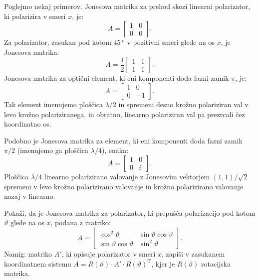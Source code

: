 Poglejmo nekaj primerov. Jonesova matrika za prehod skozi linearni polarizator, ki
polarizira v smeri $x$, je:
\begin{equation}
A=\left[\begin{array}{cc}
1 & 0\\
0 & 0
\end{array}\right]\!\!.
\end{equation}
Za polarizator, zasukan pod kotom $45~\si{\degree}$ v pozitivni 
smeri glede na os $x$, je Jonesova matrika:
\begin{equation}
A=\frac{1}{2}\left[\begin{array}{cc}
1 & 1\\
1 & 1
\end{array}\right]\!\!.
\end{equation}
Jonesova matrika za optični element, ki eni komponenti doda fazni zamik $\pi$, je:
\begin{equation}
A=\left[\begin{array}{cc}
1 & 0\\
0 & -1
\end{array}\right]\!\!.
\end{equation}
Tak element imenujemo ploščica $\lambda/2$ in 
spremeni desno krožno polariziran val v levo krožno
polariziranega, in obratno, linearno polariziran val pa prezrcali čez koordinatno os. 

Podobno je Jonesova matrika za element, ki eni komponenti doda fazni zamik $\pi/2$ 
(imenujemo ga ploščica $\lambda/4$), enaka:
\begin{equation}
A=\left[\begin{array}{cc}
1 & 0\\
0 & i
\end{array}\right]\!\!.
\end{equation}
Ploščica $\lambda/4$ linearno polarizirano valovanje z Jonesovim vektorjem $(1,1)/\sqrt{2}$
spremeni v levo krožno polarizirano valovanje in krožno polarizirano
valovanje nazaj v linearno. 

\begin{naloga}
Pokaži, da je Jonesova matrika za polarizator,
ki prepušča polarizacijo pod kotom $\vartheta$ glede na os $x$, podana z matriko:
\begin{equation}
A=\left[\begin{array}{cc}
\cos^{2}\vartheta & \sin\vartheta\cos\vartheta\\
\sin\vartheta\cos\vartheta & \sin^{2}\vartheta
\end{array}\right]\!\!.
\end{equation}
Namig: matriko $A'$, ki opisuje polarizator v smeri $x$, zapiši v zasukanem
koordinatnem sistemu $A=R(\vartheta) \cdot {A'}\cdot R(\vartheta)^\textrm{T}$, 
kjer je $R(\vartheta)$ rotacijska matrika.
\end{naloga}

